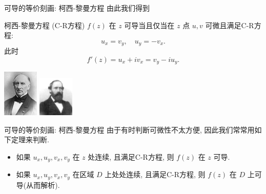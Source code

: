 \begin{frame}{可导的等价刻画: 柯西-黎曼方程}
\onslide<+->由此我们得到
\onslide<+->
\begin{alertblock}{柯西-黎曼方程 (C-R方程)}
$f(z)$ 在 $z$ 可导当且仅当在 $z$ 点 $u,v$ 可微且满足C-R方程:
\[u_x=v_y,\quad u_y=-v_x.\]
此时
\[f'(z)=u_x+iv_x=v_y-iu_y.\]
\end{alertblock}
\onslide<+->
\begin{center}
\includegraphics[width=1.7cm]{misc/Cauchy.jpeg}
\hspace{2cm}\includegraphics[width=1.7cm]{misc/Riemann.jpeg}
\end{center}
\end{frame}


\begin{frame}{可导的等价刻画: 柯西-黎曼方程}
\onslide<+->由于有时判断可微性不太方便, 因此我们常常用如下定理来判断.
\onslide<+->
\begin{theorem}
\begin{itemize}
	\item 如果 $u_x,u_y,v_x,v_y$ 在 $z$ 处连续, 且满足C-R方程, 则 $f(z)$ 在 $z$ 可导.
	\item 如果 $u_x,u_y,v_x,v_y$ 在区域 $D$ 上处处连续, 且满足C-R方程, 则 $f(z)$ 在 $D$ 上可导(从而解析).
\end{itemize}
\end{theorem}
\end{frame}






